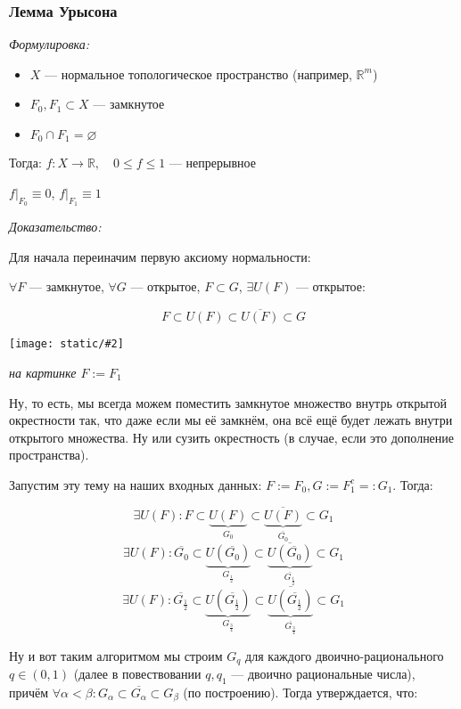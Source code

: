 \documentclass{article}
\def\images#1#2{\begin{center}\texttt{[image: static/\#2]}\end{center}}
\begin{document}
\subsubsection{Лемма Урысона}
\textit{Формулировка:}

\begin{itemize}
    \item $X$ --- нормальное топологическое пространство (например, $\mathbb{R}^m$)
    \item $F_0, F_1 \subset X$ --- замкнутое
    \item $F_0 \cap F_1 = \varnothing$
\end{itemize}

Тогда: $f: X \rightarrow \mathbb{R}, \quad 0 \le f \le 1$ --- непрерывное

$f|_{F_0} \equiv 0$, $f|_{F_1} \equiv 1$

\textit{Доказательство:}

Для начала переиначим первую аксиому нормальности: 

$\forall F$ --- замкнутое, $\forall G$ --- открытое, $F \subset G$, $\exists U(F)$ --- открытое: 

\[F \subset U(F) \subset \overline{U(F)} \subset G\]

\images{0.5}{uryhson.jpg}

\textit{на картинке $F := F_1$}

Ну, то есть, мы всегда можем поместить замкнутое множество внутрь открытой окрестности так, что даже если мы её замкнём, она всё ещё будет лежать внутри открытого множества. Ну или сузить окрестность (в случае, если это дополнение пространства).

Запустим эту тему на наших входных данных: $F := F_0, G := F^c_1 =: G_1$. Тогда:

\[\exists U(F): F \subset \underbrace{U(F)}_{G_0} \subset \underbrace{\overline{U(F)}}_{\overline{G_0}} \subset G_1\]
\[\exists U(F): \overline{G_0} \subset \underbrace{U(\overline{G_0})}_{G_{\frac{1}{2}}} \subset \underbrace{\overline{U(\overline{G_0})}}_{\overline{G_{\frac{1}{2}}}} \subset G_1\]
\[\exists U(F): \overline{G_{\frac{1}{2}}} \subset \underbrace{U(\overline{G_{\frac{1}{2}}})}_{G_{\frac{3}{4}}} \subset \underbrace{\overline{U(\overline{G_{\frac{1}{2}}})}}_{\overline{G_{\frac{3}{4}}}} \subset G_1\]

Ну и вот таким алгоритмом мы строим $G_q$ для каждого двоично-рационального $q \in (0, 1)$ (далее в повествовании $q, q_1$ --- двоично рациональные числа), причём $\forall \alpha < \beta: G_{\alpha} \subset \overline{G_{\alpha}} \subset G_{\beta}$ (по построению). Тогда утверждается, что:
\end{document}
